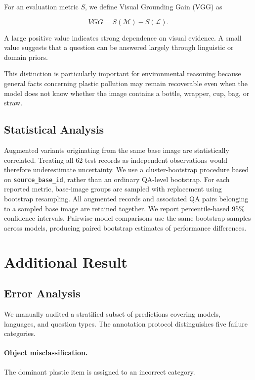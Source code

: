 \documentclass{article}
\begin{document}
For an evaluation metric $S$, we define Visual Grounding Gain (VGG) as

\begin{equation}
VGG
=
S(\mathcal{M})
-
S(\mathcal{L}).
\label{eq:vgg}
\end{equation}

A large positive value indicates strong dependence on visual evidence. A small value suggests that a question can be answered largely through linguistic or domain priors.

This distinction is particularly important for environmental reasoning because general facts concerning plastic pollution may remain recoverable even when the model does not know whether the image contains a bottle, wrapper, cup, bag, or straw.


\subsection{Statistical Analysis}
\label{subsec:statistics}

Augmented variants originating from the same base image are statistically correlated. Treating all 62 test records as independent observations would therefore underestimate uncertainty. We use a cluster-bootstrap procedure based on \texttt{source\_base\_id}, rather than an ordinary QA-level bootstrap.
For each reported metric, base-image groups are sampled with replacement using bootstrap resampling. All augmented records and associated QA pairs belonging to a sampled base image are retained together. We report percentile-based 95\% confidence intervals.
Pairwise model comparisons use the same bootstrap samples across models, producing paired bootstrap estimates of performance differences.
\section{Additional Result}
\subsection{Error Analysis}
\label{subsec:error_analysis}

We manually audited a stratified subset of predictions covering models, languages, and question types. The annotation protocol distinguishes five failure categories.

\paragraph{Object misclassification.}
The dominant plastic item is assigned to an incorrect category.
\end{document}
